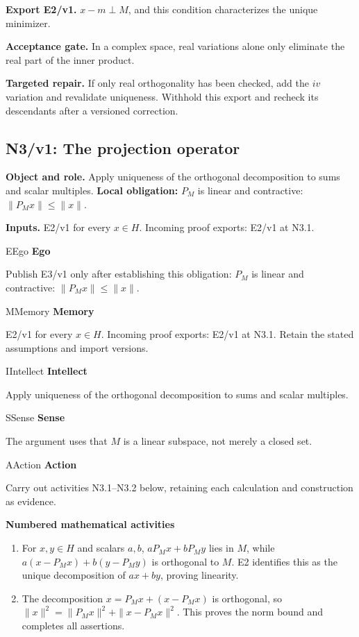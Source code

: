 \documentclass[preprint,12pt,aps,pra,showkeys,amsmath,amssymb,superscriptaddress,floatfix]{revtex4-2}
\theoremstyle{definition}
\theoremstyle{remark}
\newcommand{\mmfaculty}[3]{%
 \begin{mmfacultybox}{#1}{#2}
 {\sffamily\bfseries\color{MMBlue}#2}\par\smallskip #3
 \end{mmfacultybox}}
\newcommand{\field}[2]{\par\smallskip\noindent\textbf{#1.} #2\par}
\begin{document}
\field{Export E2/v1}{\(x-m\perp M\), and this condition characterizes the unique minimizer.}

\field{Acceptance gate}{In a complex space, real variations alone only eliminate the real part
of the inner product.}

\field{Targeted repair}{If only real orthogonality has been checked, add the \(iv\) variation
and revalidate uniqueness. Withhold this export and recheck its
descendants after a versioned correction.}

\clearpage

\subsection{N3/v1: The projection operator}

\field{Object and role}{Apply uniqueness of the orthogonal decomposition to sums and scalar
multiples. \textbf{Local obligation:} \(P_M\) is linear and contractive:
\(\|P_Mx\|\le\|x\|\).}

\field{Inputs}{E2/v1 for every \(x\in H\). Incoming proof exports: E2/v1 at N3.1.}

\mmfaculty{E}{Ego}{Publish E3/v1 only after establishing this obligation: \(P_M\) is linear
and contractive: \(\|P_Mx\|\le\|x\|\).}

\mmfaculty{M}{Memory}{E2/v1 for every \(x\in H\). Incoming proof exports: E2/v1 at N3.1.
Retain the stated assumptions and import versions.}

\mmfaculty{I}{Intellect}{Apply uniqueness of the orthogonal decomposition to sums and scalar
multiples.}

\mmfaculty{S}{Sense}{The argument uses that \(M\) is a linear subspace, not merely a closed
set.}

\mmfaculty{A}{Action}{Carry out activities N3.1--N3.2 below, retaining each calculation and
construction as evidence.}

\smallskip\noindent\textbf{Numbered mathematical activities}

\begin{enumerate}[label=N3.\arabic*,leftmargin=3.4em]

\item For \(x,y\in H\) and scalars \(a,b\), \(aP_Mx+bP_My\) lies in \(M\),
while \(a(x-P_Mx)+b(y-P_My)\) is orthogonal to \(M\). E2 identifies this
as the unique decomposition of \(ax+by\), proving linearity.

\item The decomposition \(x=P_Mx+(x-P_Mx)\) is orthogonal, so
\(\|x\|^2=\|P_Mx\|^2+\|x-P_Mx\|^2\). This proves the norm bound and
completes all assertions.

\end{enumerate}
\end{document}
